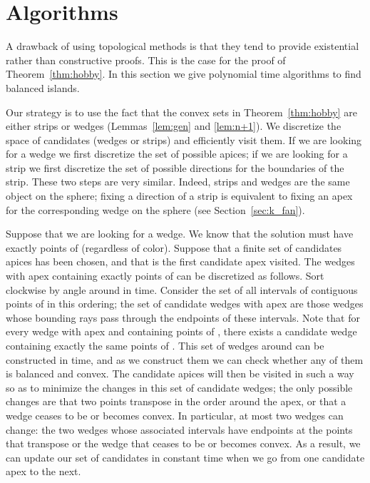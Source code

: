\documentclass{article}
\begin{document}
\section{Algorithms} \label{sec:algo}

A drawback of using topological methods is that they tend  to provide
existential rather than constructive proofs. This is the case
for the proof of Theorem~\ref{thm:hobby}. In this section we give polynomial time
algorithms to find balanced islands.

Our strategy is to use the fact that the convex sets in 
Theorem~\ref{thm:hobby} are either strips or wedges (Lemmas~\ref{lem:gen} and \ref{lem:n+1}). We discretize
the space of candidates (wedges or strips) and efficiently visit them.
 If we are looking for a wedge we first discretize
the set of possible apices; if we are looking for a strip
we first discretize the set of possible directions for the boundaries of the strip.
These two steps are very similar. Indeed,
strips and wedges are the same object on the sphere; 
fixing a direction of a strip is equivalent to fixing
an apex for the corresponding wedge on the sphere (see Section~\ref{sec:k_fan}). 

Suppose that we are looking for a wedge.  We know that
the solution must have exactly  points of  (regardless of color).
Suppose that a finite set of candidates apices has been chosen, and
that  is the first candidate apex visited.
The wedges with apex  containing exactly  points
of  can be discretized as follows. Sort  clockwise by angle
around   in  time. Consider the set of 
all intervals  of  contiguous points of  in this ordering; 
the set of candidate wedges with apex  are those wedges 
whose bounding rays pass through the endpoints
of these intervals. Note that for every wedge with
apex  and containing  points of , there exists
a candidate wedge containing exactly the same points of . 
This set of wedges around  can be constructed in   
time, and as we construct them we can check whether any of them
is balanced and convex. The candidate apices will then be visited in such a way so as
to minimize the changes in this set of candidate wedges; the only possible
changes are that two points transpose in the order around
the apex, or that a wedge ceases to be or becomes convex. In particular, 
at most two wedges can change: the two wedges whose  associated intervals
have endpoints at the points that transpose or the wedge that ceases to be or becomes 
convex. As a result, we can update our set of candidates in constant time when we go 
from one candidate apex to the next.  
\end{document}
